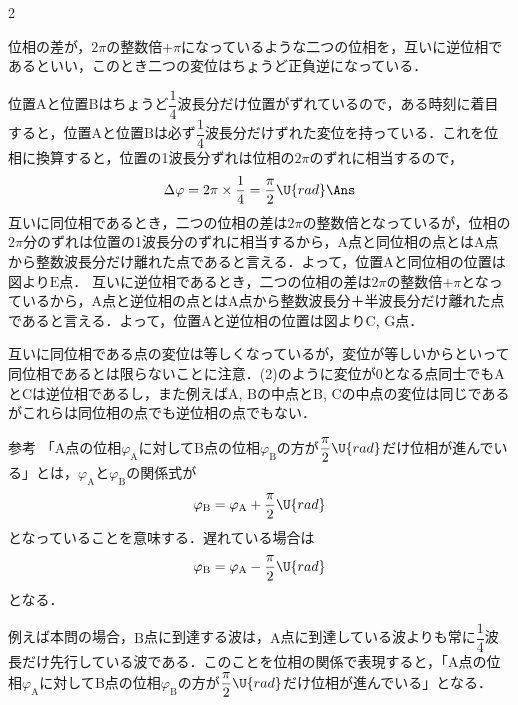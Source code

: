 \begin{multicols}{2}
\begin{sisin}
位相の差が，$2\pi$の整数倍$+\pi$になっているような二つの位相を，互いに逆位相であるといい，このとき二つの変位はちょうど正負逆になっている．
\end{sisin}
\KaiHead
\begin{komon}
 位置$\mathrm{A}$と位置$\mathrm{B}$はちょうど$\dfrac{1}{4}$波長分だけ位置がずれているので，ある時刻に着目すると，位置$\mathrm{A}$と位置$\mathrm{B}$は必ず$\dfrac{1}{4}$波長分だけずれた変位を持っている．これを位相に換算すると，位置の1波長分ずれは位相の$2\pi$のずれに相当するので，
       \[\Delta\varphi=2\pi\times\frac{1}{4}=\frac{\pi}{2}\U{rad}\Ans\]
 互いに同位相であるとき，二つの位相の差は$2\pi$の整数倍となっているが，位相の$2\pi$分のずれは位置の1波長分のずれに相当するから，$\mathrm{A}$点と同位相の点とは$\mathrm{A}$点から整数波長分だけ離れた点であると言える．よって，位置$\mathrm{A}$と同位相の位置は図より$\mathrm{E}$点．\hspace*{\fill}\Ans
 互いに逆位相であるとき，二つの位相の差は$2\pi$の整数倍$+\pi$となっているから，$\mathrm{A}$点と逆位相の点とは$\mathrm{A}$点から整数波長分＋半波長分だけ離れた点であると言える．よって，位置$\mathrm{A}$と逆位相の位置は図より$\mathrm{C}$, $\mathrm{G}$点．\hspace*{\fill}\Ans
\end{komon}
\begin{chuu}
互いに同位相である点の変位は等しくなっているが，変位が等しいからといって同位相であるとは限らないことに注意．(2)のように変位が0となる点同士でも$\mathrm{A}$と$\mathrm{C}$は逆位相であるし，また例えば$\mathrm{A}$, $\mathrm{B}$の中点と$\mathrm{B}$, $\mathrm{C}$の中点の変位は同じであるがこれらは同位相の点でも逆位相の点でもない．
\end{chuu}
\begin{bsHosoku}{参考}
「$\mathrm{A}$点の位相$\varphi_\mathrm{A}$に対して$\mathrm{B}$点の位相$\varphi_\mathrm{B}$の方が$\dfrac{\pi}{2}\U{rad}$だけ位相が進んでいる」とは，$\varphi_\mathrm{A}$と$\varphi_\mathrm{B}$の関係式が
\[\varphi_\mathrm{B}=\varphi_\mathrm{A}+\frac{\pi}{2}\U{rad}\]
となっていることを意味する．遅れている場合は
\[\varphi_\mathrm{B}=\varphi_\mathrm{A}-\frac{\pi}{2}\U{rad}\]
となる．

例えば本問の場合，$\mathrm{B}$点に到達する波は，$\mathrm{A}$点に到達している波よりも常に$\dfrac{1}{4}$波長だけ先行している波である．このことを位相の関係で表現すると，「$\mathrm{A}$点の位相$\varphi_\mathrm{A}$に対して$\mathrm{B}$点の位相$\varphi_\mathrm{B}$の方が$\dfrac{\pi}{2}\U{rad}$だけ位相が進んでいる」となる．


\end{bsHosoku}
\end{multicols}
